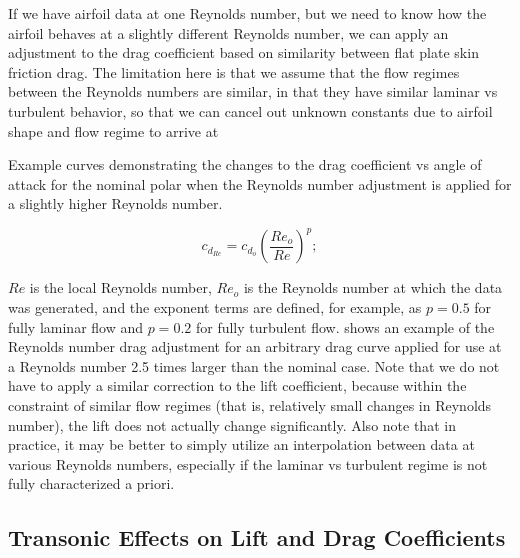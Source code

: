 If we have airfoil data at one Reynolds number, but we need to know how the airfoil behaves at a slightly different Reynolds number, we can apply an adjustment to the drag coefficient based on similarity between flat plate skin friction drag.
%
The limitation here is that we assume that the flow regimes between the Reynolds numbers are similar, in that they have similar laminar vs turbulent behavior, so that we can cancel out unknown constants due to airfoil shape and flow regime to arrive at

\begin{marginfigure}
	
    \caption{Example curves demonstrating the changes to the drag coefficient vs angle of attack for the nominal polar when the Reynolds number adjustment is applied for a slightly higher Reynolds number.}
	\label{fig:redrag-correction}
\end{marginfigure}

\begin{equation}
    c_{d_{Re}} = c_{d_o} \left(\frac{Re_o}{Re}\right)^p;
\end{equation}

\where \(Re\) is the local Reynolds number, \(Re_o\) is the Reynolds number at which the data was generated, and the exponent terms are defined, for example, as \(p=0.5\) for fully laminar flow and \(p=0.2\) for fully turbulent flow.
%
 shows an example of the Reynolds number drag adjustment for an arbitrary drag curve applied for use at a Reynolds number 2.5 times larger than the nominal case.
%
Note that we do not have to apply a similar correction to the lift coefficient, because within the constraint of similar flow regimes (that is, relatively small changes in Reynolds number), the lift does not actually change significantly.
%
Also note that in practice, it may be better to simply utilize an interpolation between data at various Reynolds numbers, especially if the laminar vs turbulent regime is not fully characterized a priori.





\subsection{Transonic Effects on Lift and Drag Coefficients}

